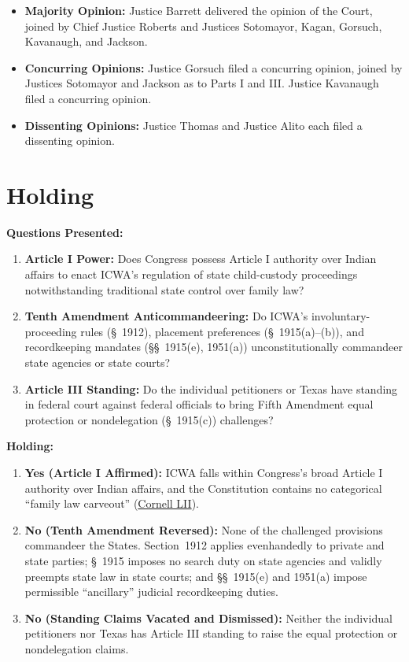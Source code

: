 \documentclass[12pt]{article}
\begin{document}
\begin{itemize}
    \item \textbf{Majority Opinion:} Justice Barrett delivered the opinion of the Court, joined by Chief Justice Roberts and Justices Sotomayor, Kagan, Gorsuch, Kavanaugh, and Jackson.
    \item \textbf{Concurring Opinions:} Justice Gorsuch filed a concurring opinion, joined by Justices Sotomayor and Jackson as to Parts I and III. Justice Kavanaugh filed a concurring opinion.
    \item \textbf{Dissenting Opinions:} Justice Thomas and Justice Alito each filed a dissenting opinion.
\end{itemize}

\section{Holding}
\textbf{Questions Presented:}

\begin{enumerate}
    \item \textbf{Article I Power:} Does Congress possess Article I authority over Indian affairs to enact ICWA's regulation of state child-custody proceedings notwithstanding traditional state control over family law?
    \item \textbf{Tenth Amendment Anticommandeering:} Do ICWA's involuntary-proceeding rules (\S~1912), placement preferences (\S~1915(a)--(b)), and recordkeeping mandates (\S\S~1915(e), 1951(a)) unconstitutionally commandeer state agencies or state courts?
    \item \textbf{Article III Standing:} Do the individual petitioners or Texas have standing in federal court against federal officials to bring Fifth Amendment equal protection or nondelegation (\S~1915(c)) challenges?
\end{enumerate}

\textbf{Holding:}

\begin{enumerate}
    \item \textbf{Yes (Article I Affirmed):} ICWA falls within Congress's broad Article I authority over Indian affairs, and the Constitution contains no categorical ``family law carveout'' (\href{https://www.law.cornell.edu/supremecourt/text/21-376}{Cornell LII}).
    \item \textbf{No (Tenth Amendment Reversed):} None of the challenged provisions commandeer the States. Section~1912 applies evenhandedly to private and state parties; \S~1915 imposes no search duty on state agencies and validly preempts state law in state courts; and \S\S~1915(e) and 1951(a) impose permissible ``ancillary'' judicial recordkeeping duties.
    \item \textbf{No (Standing Claims Vacated and Dismissed):} Neither the individual petitioners nor Texas has Article III standing to raise the equal protection or nondelegation claims.
\end{enumerate}
\end{document}
